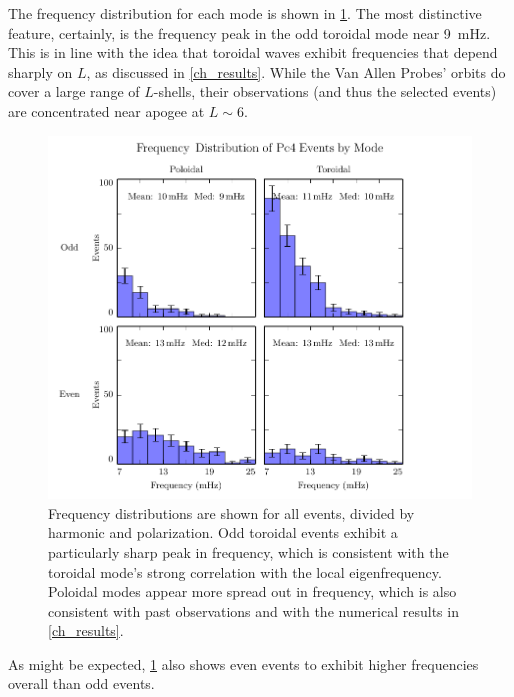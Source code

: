 

The frequency distribution for each mode is shown in \cref{fig_f}. The most
distinctive feature, certainly, is the frequency peak in the odd toroidal mode
near \SI{9}{\mHz}. This is in line with the idea that toroidal waves exhibit
frequencies that depend sharply on $L$, as discussed in \cref{ch_results}.
While the Van Allen Probes' orbits do cover a large range of $L$-shells, their
observations (and thus the selected events) are concentrated near apogee at
$L \sim 6$. 

\begin{figure}[!htb]
  \centering
  \includegraphics[width=\textwidth]{figures/f.pdf}
  \caption[Frequency Distribution of Pc4 Events by Mode]{
    Frequency distributions are shown for all events, divided by harmonic and
    polarization. Odd toroidal events exhibit a particularly sharp peak in
    frequency, which is consistent with the toroidal mode's strong correlation
    with the local eigenfrequency. Poloidal modes appear more spread out in
    frequency, which is also consistent with past observations and with the
    numerical results in \cref{ch_results}. 
  }
  \label{fig_f}
\end{figure}

As might be expected, \cref{fig_f} also shows even events to exhibit higher
frequencies overall than odd events. 

